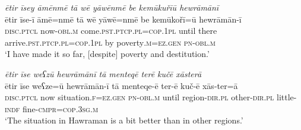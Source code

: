 \ea \label{ŽM.54}
\textit{ētir īsey āmēnmē tā wē yāwēnmē be kemūkuřīū hewrāmānī} \\ 
\gll ētir īse-ī āmē=nmē tā wē yāwē=nmē be kemūkořī=ū hewrāmān-ī \\ 
 \textsc{disc}.\textsc{ptcl} now\textsc{-obl}\textsc{.m} come\textsc{.pst}\textsc{.ptcp}\textsc{.pl}\textsc{=cop}\textsc{.\textsc{1pl}} until there arrive\textsc{.pst}\textsc{.ptcp}\textsc{.pl}\textsc{=cop}\textsc{.\textsc{1pl}} by poverty\textsc{.m}\textsc{=ez.gen} \textsc{pn}\textsc{-obl}\textsc{.m} \\ 
\glt `I have made it so far, [despite] poverty and destitution.'
\z 
 
\ea \label{ŽM.55}
\textit{ētir īse weʕzū hewrāmānī tā menteqē terē kučē xāsterā} \\ 
\gll ētir īse weʕze=ū hewrāmān-ī tā menteqe-ē ter-ē kuč-ē xās-ter=ā \\ 
 \textsc{disc}.\textsc{ptcl} now situation\textsc{.f}\textsc{=ez.gen} \textsc{pn}\textsc{-obl}\textsc{.m} until region\textsc{-dir}\textsc{.pl} other\textsc{-dir}\textsc{.pl} little\textsc{-indf} fine\textsc{-cmpr}\textsc{=cop}\textsc{.3sg}\textsc{.m} \\ 
\glt `The situation in Hawraman is a bit better than in other regions.'
\z 
 
